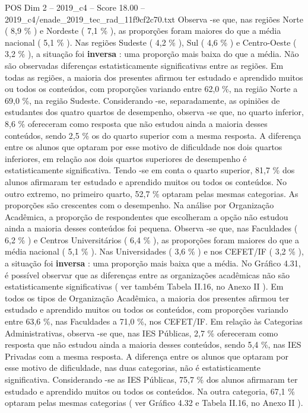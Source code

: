 \begin{textsample}{POS Dim 2 – 2019\_c4 – Score 18.00 – 2019\_c4/enade\_2019\_tec\_rad\_11f9cf2c70.txt}
Observa -se que, nas regiões Norte ( 8,9 \% ) e Nordeste ( 7,1 \% ), as proporções foram maiores do que a média nacional ( 5,1 \% ).
Nas regiões Sudeste ( 4,2 \% ), Sul ( 4,6 \% ) e Centro-Oeste ( 3,2 \% ), a situação foi \textbf{inversa} : uma proporção mais baixa do que a média.
Não são observadas diferenças estatisticamente significativas entre as regiões.
Em todas as regiões, a maioria dos presentes afirmou ter estudado e aprendido muitos ou todos os conteúdos, com proporções variando entre 62,0 \%, na região Norte a 69,0 \%, na região Sudeste.
Considerando -se, separadamente, as opiniões de estudantes dos quatro quartos de desempenho, observa -se que, no quarto inferior, 8,6 \% ofereceram como resposta que não estudou ainda a maioria desses conteúdos, sendo 2,5 \% os do quarto superior com a mesma resposta.
A diferença entre os alunos que optaram por esse motivo de dificuldade nos dois quartos inferiores, em relação aos dois quartos superiores de desempenho é estatisticamente significativa.
Tendo -se em conta o quarto superior, 81,7 \% dos alunos afirmaram ter estudado e aprendido muitos ou todos os conteúdos.
No outro extremo, no primeiro quarto, 52,7 \% optaram pelas mesmas categorias.
As proporções são crescentes com o desempenho.
Na análise por Organização Acadêmica, a proporção de respondentes que escolheram a opção não estudou ainda a maioria desses conteúdos foi pequena.
Observa -se que, nas Faculdades ( 6,2 \% ) e Centros Universitários ( 6,4 \% ), as proporções foram maiores do que a média nacional ( 5,1 \% ).
Nas Universidades ( 3,6 \% ) e nos CEFET/IF ( 3,2 \% ), a situação foi \textbf{inversa} : uma proporção mais baixa que a média.
No Gráfico 4.31, é possível observar que as diferenças entre as organizações acadêmicas não são estatisticamente significativas ( ver também Tabela II.16, no Anexo II ).
Em todos os tipos de Organização Acadêmica, a maioria dos presentes afirmou ter estudado e aprendido muitos ou todos os conteúdos, com proporções variando entre 63,6 \%, nas Faculdades a 71,0 \%, nos CEFET/IF.
Em relação às Categorias Administrativas, observa -se que, nas IES Públicas, 2,7 \% ofereceram como resposta que não estudou ainda a maioria desses conteúdos, sendo 5,4 \%, nas IES Privadas com a mesma resposta.
A diferença entre os alunos que optaram por esse motivo de dificuldade, nas duas categorias, não é estatisticamente significativa.
Considerando -se as IES Públicas, 75,7 \% dos alunos afirmaram ter estudado e aprendido muitos ou todos os conteúdos.
Na outra categoria, 67,1 \% optaram pelas mesmas categorias ( ver Gráfico 4.32 e Tabela II.16, no Anexo II ).

\end{textsample}
